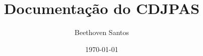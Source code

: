 
\title{Documentação do CDJPAS}
\author{Beethoven Santos}
\date{\today}

\newcommand{\affil}{
    Observatório Nacional (ON)\\
    Coordenação de Astronomia e Astrofísica (COAST)\\
    Divisão de Tecnologia da Informação (DITIN)
}
\newcommand{\authorshort}{B. Santos}
\newcommand{\keywords}{documentação, cluster, computação, HPC}
